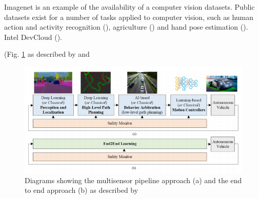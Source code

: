 







Imagenet is an example of the availability of a computer vision datasets. Public datasets exist for a number of tasks applied to computer vision, such as  
human action and activity recognition (\cite{chaquet2013survey}), agriculture (\cite{lu2020survey}) and hand pose estimation (\cite{li2019survey}).
Intel DevCloud (\cite{IntelDevCloud2020}).


% 
(Fig. \ref{fig:grigorescu-pipeline} as described by \cite{Grigorescu_2020} and \cite{Yurtsever_2020}

\begin{figure}[ht]
 \centering 
 \includegraphics[scale=0.85]{Figures/grigorescu-pipeline.png}
 \caption{Diagrams showing the multisensor pipeline approach (a) and the end to end approach (b) as described by \cite{Grigorescu_2020}}
 \label{fig:grigorescu-pipeline}
\end{figure}


